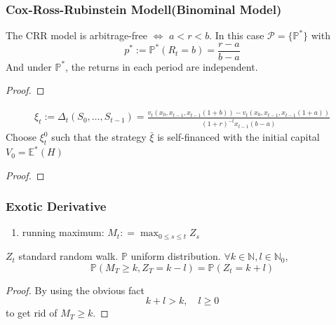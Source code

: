 \begin{definition}
\end{definition}
\begin{remark}
\end{remark}


\subsubsection{Cox-Ross-Rubinstein Modell(Binominal Model)}
\begin{theorem}
	\quad \newline
	The CRR model is arbitrage-free $\Leftrightarrow$ $a < r < b$.
	In this case $\mathcal{P} = \{ \mathbb{P}^*\}$ with
	\begin{equation*}
		p^* := \mathbb{P}^*(R_t = b) = \frac{r - a}{b - a}
	\end{equation*} 
	And under $\mathbb{P}^*$, the returns in each period are independent.
\end{theorem}
\begin{proof}
\end{proof}

\begin{theorem}
	\begin{align*}
		\xi_t := \Delta_t(S_0, \dots, S_{t - 1}) = \frac{v_t(x_0, x_{t - 1}, x_{t-1}(1 + b)) - v_t(x_0, x_{t - 1}, x_{t-1}(1 + a))}{(1 + r)^{-t} x_{t - 1}(b -a)}
	\end{align*}
	Choose $\xi^0_t$ such that the strategy $\bar{\xi}$ is self-financed with the initial capital $V_0 = \mathbb{E}^*(H)$
\end{theorem}
\begin{proof}
\end{proof}


\subsubsection*{Exotic Derivative}
\begin{definition} \quad
	\begin{enumerate}
		\item running maximum: $M_t : = \max_{0 \leq s \leq t} Z_s$
	\end{enumerate}
\end{definition}

\begin{theorem}
	$Z_t$ standard random walk. $\mathbb{P}$ uniform distribution.
	$\forall k \in \mathbb{N}, l \in \mathbb{N}_0$,
	\begin{equation*}
		\mathbb{P}(M_T \geq k, Z_T = k - l) = \mathbb{P}(Z_t = k + l)
	\end{equation*}
\end{theorem}
\begin{proof}
	By using the obvious fact
	\begin{equation*}
		k+l > k, \quad l \geq 0
	\end{equation*}
	to get rid of $M_T \geq k$. 
\end{proof}

